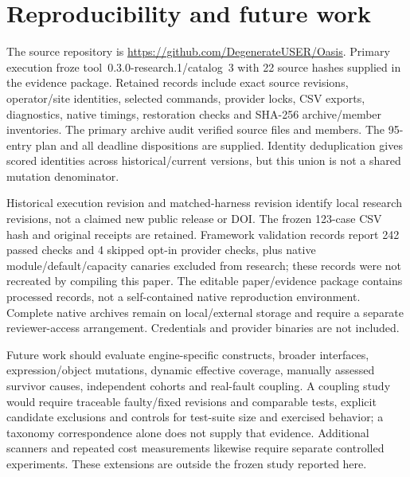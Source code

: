 \section{Reproducibility and future work}\label{sec:repro}
The source repository is \url{https://github.com/DegenerateUSER/Oasis}. Primary execution froze tool~0.3.0-research.1/catalog~3 with 22 source hashes supplied in the evidence package. Retained records include exact source revisions, operator/site identities, selected commands, provider locks, CSV exports, diagnostics, native timings, restoration checks and SHA-256 archive/member inventories. The primary archive audit verified \VerifiedSourceFiles{} source files and \VerifiedArchiveMembers{} members. The 95-entry plan and all deadline dispositions are supplied. Identity deduplication gives \UnionScoredRepos{} scored identities across historical/current versions, but this union is not a shared mutation denominator.

Historical execution revision  and matched-harness revision  identify local research revisions, not a claimed new public release or DOI. The frozen 123-case CSV hash and original receipts are retained. Framework validation records report 242 passed checks and 4 skipped opt-in provider checks, plus native module/default/capacity canaries excluded from research; these records were not recreated by compiling this paper. The editable paper/evidence package contains processed records, not a self-contained native reproduction environment. Complete native archives remain on local/external storage and require a separate reviewer-access arrangement. Credentials and provider binaries are not included.

Future work should evaluate engine-specific constructs, broader interfaces, expression/object mutations, dynamic effective coverage, manually assessed survivor causes, independent cohorts and real-fault coupling. A coupling study would require traceable faulty/fixed revisions and comparable tests, explicit candidate exclusions and controls for test-suite size and exercised behavior; a taxonomy correspondence alone does not supply that evidence. Additional scanners and repeated cost measurements likewise require separate controlled experiments. These extensions are outside the frozen study reported here.

